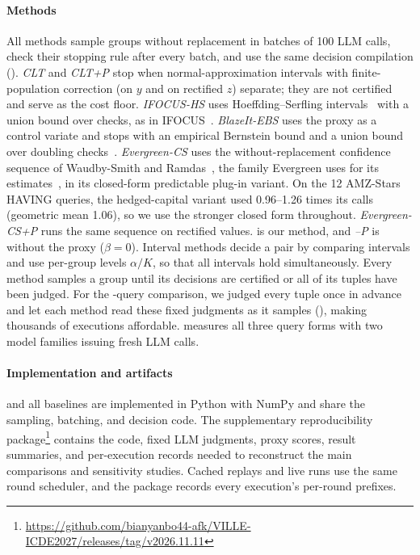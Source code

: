 \paragraph*{Methods}
All methods sample groups without replacement in batches of 100 LLM calls, check their stopping rule after every batch, and use the same decision compilation ().
\emph{CLT} and \emph{CLT+P} stop when normal-approximation intervals with finite-population correction (on $y$ and on rectified $z$) separate; they are not certified and serve as the cost floor.
\emph{IFOCUS-HS} uses Hoeffding--Serfling intervals~\cite{hoeffding1963,serfling1974} with a union bound over checks, as in IFOCUS~\cite{ifocus}.
\emph{BlazeIt-EBS} uses the proxy as a control variate and stops with an empirical Bernstein bound and a union bound over doubling checks~\cite{blazeit,mnih2008,maurer2009}.
\emph{Evergreen-CS} uses the without-replacement confidence sequence of Waudby-Smith and Ramdas~\cite{wsr2020wor,wsr2024betting}, the family Evergreen uses for its estimates~\cite{evergreen}, in its closed-form predictable plug-in variant. On the 12 AMZ-Stars HAVING queries, the hedged-capital variant used 0.96--1.26 times its calls (geometric mean 1.06), so we use the stronger closed form throughout. \emph{Evergreen-CS+P} runs the same sequence on rectified values.
\emph{\sys{}} is our method, and \emph{\sys{}--P} is \sys{} without the proxy ($\beta=0$).
Interval methods decide a pair by comparing intervals and use per-group levels $\alpha/K$, so that all intervals hold simultaneously.
Every method samples a group until its decisions are certified or all of its tuples have been judged.
For the \numNQ-query comparison, we judged every tuple once in advance and let each method read these fixed judgments as it samples (), making thousands of executions affordable.
 measures all three query forms with two model families issuing fresh LLM calls.

\paragraph*{Implementation and artifacts}
\sys{} and all baselines are implemented in Python with NumPy and share the sampling, batching, and decision code.
The supplementary reproducibility package\footnote{\url{https://github.com/bianyanbo44-afk/VILLE-ICDE2027/releases/tag/v2026.11.11}} contains the code, fixed LLM judgments, proxy scores, result summaries, and per-execution records needed to reconstruct the main comparisons and sensitivity studies.
Cached replays and live runs use the same round scheduler, and the package records every execution's per-round prefixes.

